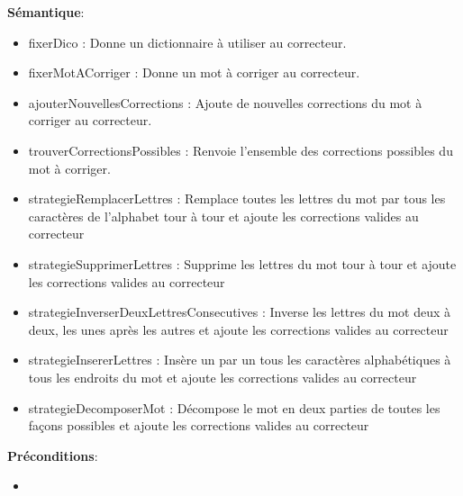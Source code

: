 \documentclass{article}
\begin{document}
    \textbf{Sémantique}: \begin{itemize}[label=$\- $, leftmargin=2cm, itemsep=0cm]
        \item fixerDico : Donne un dictionnaire à utiliser au correcteur.
        \item fixerMotACorriger : Donne un mot à corriger au correcteur.
        \item ajouterNouvellesCorrections : Ajoute de nouvelles corrections du mot à corriger au correcteur.
        \item trouverCorrectionsPossibles : Renvoie l'ensemble des corrections possibles du mot à corriger.
        \item strategieRemplacerLettres : Remplace toutes les lettres du mot par tous les caractères de l'alphabet tour à tour et ajoute les corrections valides au correcteur
        \item strategieSupprimerLettres : Supprime les lettres du mot tour à tour et ajoute les corrections valides au correcteur
        \item strategieInverserDeuxLettresConsecutives : Inverse les lettres du mot deux à deux, les unes après les autres et ajoute les corrections valides au correcteur
        \item strategieInsererLettres : Insère un par un tous les caractères alphabétiques à tous les endroits du mot et ajoute les corrections valides au correcteur
        \item strategieDecomposerMot : Décompose le mot en deux parties de toutes les façons possibles et ajoute les corrections valides au correcteur
    \end{itemize}
        
    \textbf{Préconditions}: \begin{itemize}[label=$\- $, leftmargin=2cm, itemsep=0cm]
        \item
    \end{itemize}
\end{document}
